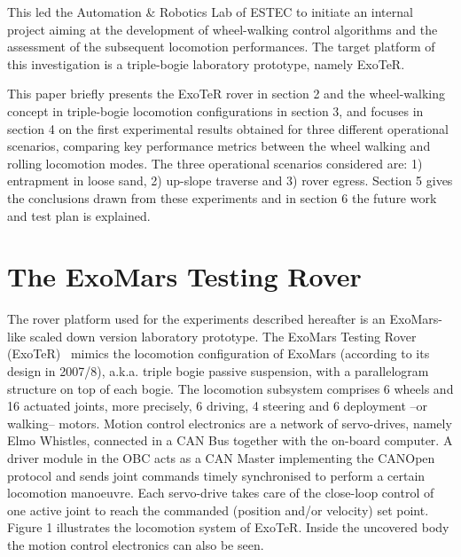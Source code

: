\documentclass[a4paper,twocolumn]{esapub2005} %
\begin{document}
This led the Automation \& Robotics Lab of ESTEC to initiate an internal
project aiming at the development of wheel-walking control algorithms and the
assessment of the subsequent locomotion performances. The target platform of
this investigation is a triple-bogie laboratory prototype, namely ExoTeR.

This paper briefly presents the ExoTeR rover in section 2 and the wheel-walking
concept in triple-bogie locomotion configurations in section 3, and focuses in
section 4 on the first experimental results obtained for three different
operational scenarios, comparing key performance metrics between the wheel
walking and rolling locomotion modes. The three operational scenarios
considered are: 1) entrapment in loose sand, 2) up-slope traverse and 3) rover
egress. Section 5 gives the conclusions drawn from these experiments and in
section 6 the future work and test plan is explained.

\section{The ExoMars Testing Rover}

The rover platform used for the experiments described hereafter is an
ExoMars-like scaled down version laboratory prototype. The ExoMars Testing
Rover (ExoTeR)~\cite{Azkarate2015} mimics the locomotion configuration of
ExoMars (according to its design in 2007/8), a.k.a. triple bogie passive
suspension, with a parallelogram structure on top of each bogie. The locomotion
subsystem comprises 6 wheels and 16 actuated joints, more precisely, 6 driving,
4 steering and 6 deployment –or walking– motors.  Motion control electronics
are a network of servo-drives, namely Elmo Whistles, connected in a CAN Bus
together with the on-board computer. A driver module in the OBC acts as a CAN
Master implementing the CANOpen protocol and sends joint commands timely
synchronised to perform a certain locomotion manoeuvre. Each servo-drive takes
care of the close-loop control of one active joint to reach the commanded
(position and/or velocity) set point.  Figure 1 illustrates the locomotion
system of ExoTeR. Inside the uncovered body the motion control electronics can
also be seen.
\end{document}
